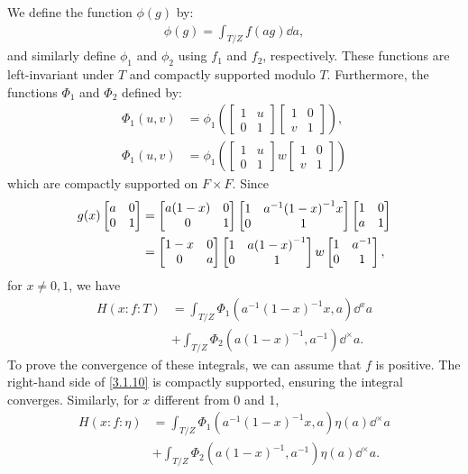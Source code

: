 We define the function $\phi(g)$ by:
\begin{align}
    \phi(g) = \int_{T/Z} f(ag) \dd a,
\end{align}
and similarly define $\phi_1$ and $\phi_2$ using $f_1$ and $f_2$, respectively.
These functions are left-invariant under $T$ and compactly supported modulo $T$. 
Furthermore, the functions $\Phi_1$ and $\Phi_2$ defined by:
\begin{align}
    \Phi_1(u, v) &= \phi_1 \left(\begin{bmatrix} 1 & u \\ 0 & 1\end{bmatrix}\begin{bmatrix}1 & 0 \\ v& 1\end{bmatrix}\right), \\
    \Phi_1(u, v) &= \phi_1 \left(\begin{bmatrix} 1 & u \\ 0 & 1\end{bmatrix}w\begin{bmatrix}1 & 0 \\ v& 1\end{bmatrix}\right)
\end{align}
which are compactly supported on $F \times F$.
Since
\begin{equation}
\begin{aligned}
    g(x) \begin{bmatrix} a & 0 \\ 0 & 1 \end{bmatrix} &= \begin{bmatrix} a(1-x) & 0 \\ 0 & 1 \end{bmatrix} \begin{bmatrix} 1 & a^{-1}{(1-x)}^{-1}x \\ 0 & 1 \end{bmatrix} \begin{bmatrix} 1 & 0 \\ a & 1 \end{bmatrix} \\
    &= \begin{bmatrix} 1-x & 0 \\ 0 & a \end{bmatrix} \begin{bmatrix} 1 & a{(1-x)}^{-1} \\ 0 & 1 \end{bmatrix} w \begin{bmatrix} 1 & a^{-1} \\ 0 & 1 \end{bmatrix},
\end{aligned}
\end{equation}
for $x \neq 0, 1$, we have
\begin{equation}
\begin{aligned}
\label{3.1.10}
    H(x:f:T) &= \int_{T/Z} \Phi_1(a^{-1}(1-x)^{-1}x, a) \dd^{x}a \\
    &+ \int_{T/Z} \Phi_2 (a(1-x)^{-1}, a^{-1}) \dd^{\times}a. 
\end{aligned}
\end{equation}
To prove the convergence of these integrals, we can assume that $f$ is positive.
The right-hand side of \eqref{3.1.10} is compactly supported, ensuring the integral converges.
Similarly, for $x$ different from 0 and 1,
\begin{equation}
\begin{aligned}
\label{3.1.11}
    H(x:f:\eta) &= \int_{T/Z} \Phi_1(a^{-1}(1-x)^{-1}x, a) \eta(a) \dd^\times a \\
    &+ \int_{T/Z} \Phi_2(a(1-x)^{-1}, a^{-1}) \eta(a) \dd^{\times} a.
\end{aligned}
\end{equation}

